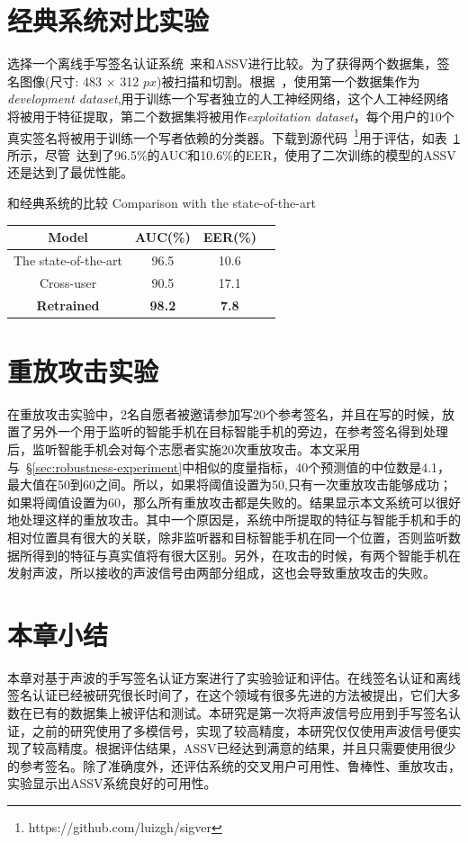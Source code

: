 \section{经典系统对比实验}
选择一个离线手写签名认证系统~\cite{hafemann2017learning}来和ASSV进行比较。为了获得两个数据集，签名图像(尺寸: 483 $\times$ 312 $px$)被扫描和切割。根据~\cite{hafemann2017learning}，使用第一个数据集作为\textit{development dataset},用于训练一个写者独立的人工神经网络，这个人工神经网络将被用于特征提取，第二个数据集将被用作\textit{exploitation dataset}，每个用户的10个真实签名将被用于训练一个写者依赖的分类器。下载到源代码~\footnote{https://github.com/luizgh/sigver}用于评估，如表~\ref{table:the-state-the-art}所示，尽管~\cite{hafemann2017learning}达到了96.5\%的AUC和10.6\%的EER，使用了二次训练的模型的ASSV还是达到了最优性能。
\begin{table}[ht]
  \centering
    \bicaption
    {和经典系统的比较}
    {Comparison with the state-of-the-art}
    \label{table:the-state-the-art} 
    \begin{tabular}{c c c c} 
      \hline\hline 
      Model & AUC(\%) & EER(\%) \\ 
      \hline 
      The state-of-the-art & 96.5 & 10.6\\
      Cross-user & 90.5 & 17.1 \\
      \textbf{Retrained} & \textbf{98.2} & \textbf{7.8}\\
      \hline 
    \end{tabular}
\end{table}

\section{重放攻击实验}

在重放攻击实验中，2名自愿者被邀请参加写20个参考签名，并且在写的时候，放置了另外一个用于监听的智能手机在目标智能手机的旁边，在参考签名得到处理后，监听智能手机会对每个志愿者实施20次重放攻击。本文采用与~\S\ref{sec:robustness-experiment}中相似的度量指标，40个预测值的中位数是4.1，最大值在50到60之间。所以，如果将阈值设置为50,只有一次重放攻击能够成功；如果将阈值设置为60，那么所有重放攻击都是失败的。结果显示本文系统可以很好地处理这样的重放攻击。其中一个原因是，系统中所提取的特征与智能手机和手的相对位置具有很大的关联，除非监听器和目标智能手机在同一个位置，否则监听数据所得到的特征与真实值将有很大区别。另外，在攻击的时候，有两个智能手机在发射声波，所以接收的声波信号由两部分组成，这也会导致重放攻击的失败。

\section{本章小结}
本章对基于声波的手写签名认证方案进行了实验验证和评估。在线签名认证和离线签名认证已经被研究很长时间了，在这个领域有很多先进的方法被提出，它们大多数在已有的数据集上被评估和测试。本研究是第一次将声波信号应用到手写签名认证，之前的研究使用了多模信号，实现了较高精度，本研究仅仅使用声波信号便实现了较高精度。根据评估结果，ASSV已经达到满意的结果，并且只需要使用很少的参考签名。除了准确度外，还评估系统的交叉用户可用性、鲁棒性、重放攻击，实验显示出ASSV系统良好的可用性。

